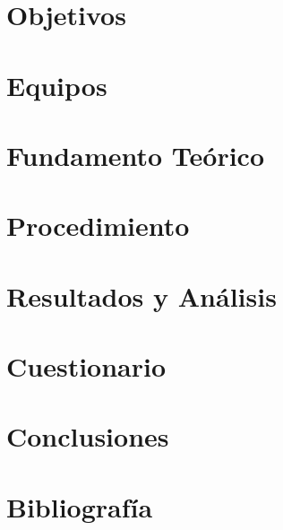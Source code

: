 \documentclass{ucsdreport}
\begin{document}
\tableofcontents{}
\pagebreak


\section{Objetivos}
\section{Equipos}
\section{Fundamento Teórico}
\section{Procedimiento}
\section{Resultados y Análisis}



\section{Cuestionario}
\section{Conclusiones}
\section{Bibliografía}


\end{document}
